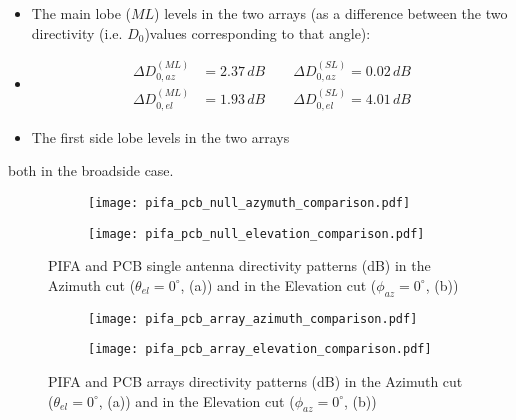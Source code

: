 \documentclass[12pt,a4paper]{article}
\begin{document}
{\begin{itemize}
	\begin{itemize}
		\item The main lobe ($ML$) levels in the two arrays (as a difference between the two directivity (i.e. $D_0$)values corresponding to that angle): 
		\item 
		\begin{equation}
			\begin{aligned}
				\Delta D_{0,az}^{(ML)} &= 2.37\,dB\qquad \Delta D_{0,az}^{(SL)} = 0.02\,dB\\
				\Delta D_{0,el}^{(ML)} &= 1.93\,dB\qquad \Delta D_{0,el}^{(SL)} = 4.01\,dB
			\end{aligned}
		\end{equation}
		\item The first side lobe levels in the two arrays
	\end{itemize}
	both in the broadside case. 
\end{itemize}
\begin{figure}[h]
	\begin{center}
		\begin{subfigure}{0.5\linewidth}
			\texttt{[image: pifa\_pcb\_null\_azymuth\_comparison.pdf]}
			\caption{}
		\end{subfigure}
		\begin{subfigure}{0.5\linewidth}
			\texttt{[image: pifa\_pcb\_null\_elevation\_comparison.pdf]}
			\caption{}	\end{subfigure}
		\caption{
			PIFA and PCB single antenna directivity patterns (dB) in the Azimuth cut  ($\theta_{el}=0^\circ$, (a)) and in the Elevation cut ($\phi_{az}=0^\circ$, (b))}
	\end{center}  
\end{figure}
\begin{figure}[h]
	\begin{center}
		\begin{subfigure}{0.5\linewidth}
			\texttt{[image: pifa\_pcb\_array\_azimuth\_comparison.pdf]}
			\caption{}
		\end{subfigure}
		\begin{subfigure}{0.5\linewidth}
			\texttt{[image: pifa\_pcb\_array\_elevation\_comparison.pdf]}
			\caption{}	\end{subfigure}
		\caption{
			PIFA and PCB arrays directivity patterns (dB) in the Azimuth cut  ($\theta_{el}=0^\circ$, (a)) and in the Elevation cut ($\phi_{az}=0^\circ$, (b))}
	\end{center}  
\end{figure}

}
\end{document}
